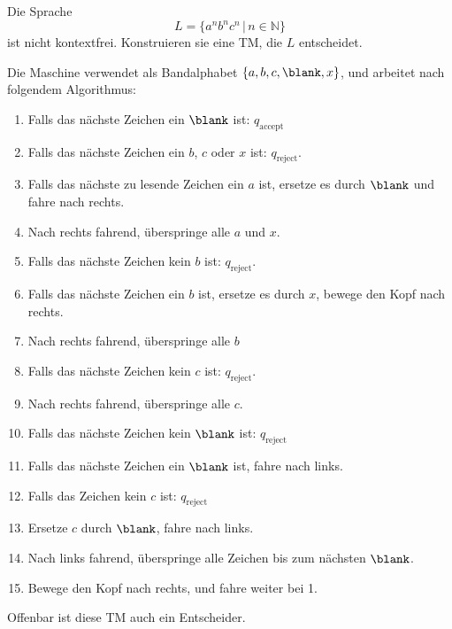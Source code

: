 Die Sprache
\[
L=\{a^nb^nc^n\,|\,n\in \mathbb N\}
\]
ist nicht kontextfrei.
Konstruieren sie eine TM, die $L$ entscheidet.


\begin{loesung}
Die Maschine verwendet als Bandalphabet $\{a,b,c,\blank,x\}$,
und arbeitet nach folgendem Algorithmus:
\begin{enumerate}
\item Falls das nächste Zeichen ein $\blank$ ist:
$q_{\text{accept}}$
\item Falls das nächste Zeichen ein $b$, $c$ oder $x$ ist:
$q_{\text{reject}}$.
\item Falls das nächste zu lesende Zeichen ein $a$ ist, ersetze
es durch $\blank$ und fahre nach rechts.
\item Nach rechts fahrend, überspringe alle $a$ und $x$.
\item Falls das nächste Zeichen kein $b$ ist:
$q_{\text{reject}}$.
\item Falls das nächste Zeichen ein $b$ ist, ersetze es durch $x$,
bewege den Kopf nach rechts.
\item Nach rechts fahrend, überspringe alle $b$
\item Falls das nächste Zeichen kein $c$ ist:
$q_{\text{reject}}$.
\item Nach rechts fahrend, überspringe alle $c$.
\item Falls das nächste Zeichen kein $\blank$ ist: $q_{\text{reject}}$
\item Falls das nächste Zeichen ein $\blank$ ist, fahre nach
links.
\item Falls das Zeichen kein $c$ ist: $q_{\text{reject}}$
\item Ersetze $c$ durch $\blank$, fahre nach links.
\item Nach links fahrend, überspringe alle Zeichen bis zum nächsten
$\blank$.
\item Bewege den Kopf nach rechts, und fahre weiter bei 1.
\end{enumerate}
Offenbar ist diese TM auch ein Entscheider.


\end{loesung}
